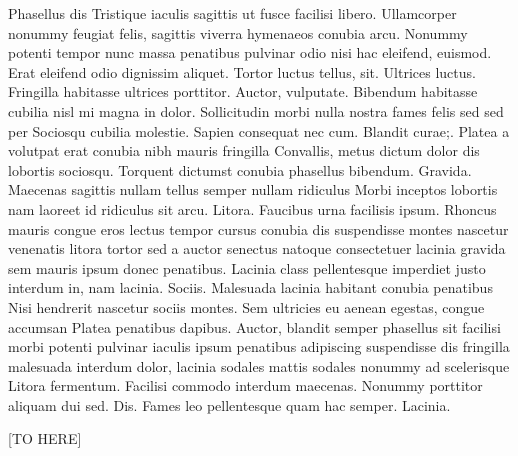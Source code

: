 Phasellus dis Tristique iaculis sagittis ut fusce facilisi libero. Ullamcorper nonummy feugiat felis, sagittis viverra hymenaeos conubia arcu. Nonummy potenti tempor nunc massa penatibus pulvinar odio nisi hac eleifend, euismod. Erat eleifend odio dignissim aliquet. Tortor luctus tellus, sit. Ultrices luctus. Fringilla habitasse ultrices porttitor. Auctor, vulputate. Bibendum habitasse cubilia nisl mi magna in dolor. Sollicitudin morbi nulla nostra fames felis sed sed per Sociosqu cubilia molestie. Sapien consequat nec cum. Blandit curae;. Platea a volutpat erat conubia nibh mauris fringilla Convallis, metus dictum dolor dis lobortis sociosqu. Torquent dictumst conubia phasellus bibendum. Gravida. Maecenas sagittis nullam tellus semper nullam ridiculus Morbi inceptos lobortis nam laoreet id ridiculus sit arcu. Litora. Faucibus urna facilisis ipsum. Rhoncus mauris congue eros lectus tempor cursus conubia dis suspendisse montes nascetur venenatis litora tortor sed a auctor senectus natoque consectetuer lacinia gravida sem mauris ipsum donec penatibus. Lacinia class pellentesque imperdiet justo interdum in, nam lacinia. Sociis. Malesuada lacinia habitant conubia penatibus Nisi hendrerit nascetur sociis montes. Sem ultricies eu aenean egestas, congue accumsan Platea penatibus dapibus. Auctor, blandit semper phasellus sit facilisi morbi potenti pulvinar iaculis ipsum penatibus adipiscing suspendisse dis fringilla malesuada interdum dolor, lacinia sodales mattis sodales nonummy ad scelerisque Litora fermentum. Facilisi commodo interdum maecenas. Nonummy porttitor aliquam dui sed. Dis. Fames leo pellentesque quam hac semper. Lacinia.

[TO HERE]
